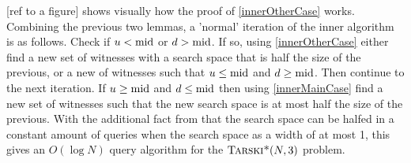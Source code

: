 [ref to a figure] shows visually how the proof of \cref{innerOtherCase} works. Combining
the previous two lemmas, a 'normal' iteration of the inner algorithm is as follows.
Check if $u < \text{mid}$ or $d > \text{mid}$. If so, using \cref{innerOtherCase} either find a new
set of witnesses with a search space that is half the size of the previous, or a new of
witnesses such that $u \leq \text{mid}$ and $d \geq \text{mid}$. Then continue to the next iteration.
If $u \geq \text{mid}$ and $d \leq \text{mid}$ then using \cref{innerMainCase} find a new set of witnesses
such that the new search space is at most half the size of the previous.
With the additional fact from \citep{fasterTarski} that the search space can be halfed in a constant amount of
queries when the search space as a width of at most 1, this gives an $O(\log N)$ query algorithm
for the $\textsc{Tarski*}(N, 3)$ problem.
